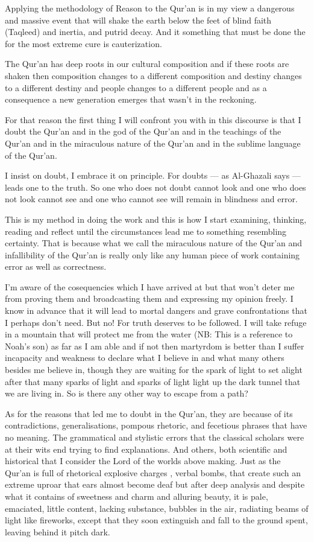 \documentclass[12pt]{book}
\begin{document}
Applying the methodology of Reason to the Qur’an is in my view a dangerous and
massive event that will shake the earth below the feet of blind faith (Taqleed)
and inertia, and putrid decay. And it something that must be done the for the
most extreme cure is cauterization.

The Qur’an has deep roots in our cultural composition and if these roots are
shaken then composition changes to a different composition and destiny changes
to a different destiny and people changes to a different people and as a
consequence a new generation emerges that wasn’t in the reckoning.

For that reason the first thing I will confront you with in this discourse is
that I doubt the Qur’an and in the god of the Qur’an and in the teachings of
the Qur’an and in the miraculous nature of the Qur’an and in the sublime
language of the Qur’an.

I insist on doubt, I embrace it on principle. For doubts — as Al-Ghazali says —
leads one to the truth. So one who does not doubt cannot look and one who does
not look cannot see and one who cannot see will remain in blindness and error.

This is my method in doing the work and this is how I start examining,
thinking, reading and reflect until the circumstances lead me to something
resembling certainty. That is because what we call the miraculous nature of the
Qur’an and infallibility of the Qur’an is really only like any human piece of
work containing error as well as correctness.

I’m aware of the cosequencies which I have arrived at but that won’t deter me
from proving them and broadcasting them and expressing my opinion freely. I
know in advance that it will lead to mortal dangers and grave confrontations
that I perhaps don’t need. But no! For truth deserves to be followed. I will
take refuge in a mountain that will protect me from the water
(NB: This is a reference to Noah’s son)
as far as I am able and if not then martyrdom is better than I suffer
incapacity and weakness to declare what I believe in and what many others
besides me believe in, though they are waiting for the spark of light to set
alight after that many sparks of light and sparks of light light up the dark
tunnel that we are living in. So is there any other way to escape from a path?

As for the reasons that led me to doubt in the Qur’an, they are because of its
contradictions, generalisations, pompous rhetoric, and fecetious phrases that
have no meaning. The grammatical and stylistic errors that the classical
scholars were at their wits end trying to find explanations. And others, both
scientific and historical that I consider the Lord of the worlds above making.
Just as the Qur’an is full of rhetorical explosive charges , verbal bombs, that
create such an extreme uproar that ears almost become deaf but after deep
analysis and despite what it contains of sweetness and charm and alluring
beauty, it is pale, emaciated, little content, lacking substance, bubbles in
the air, radiating beams of light like fireworks, except that they soon
extinguish and fall to the ground spent, leaving behind it pitch dark.
\end{document}
